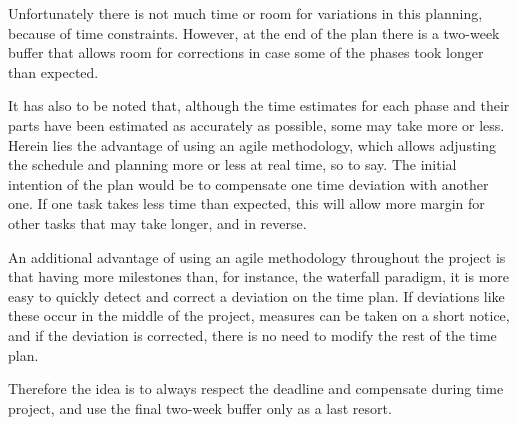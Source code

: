 Unfortunately there is not much time or room for variations in this planning, because of time constraints. However, at the end of the plan there is a two-week buffer that allows room for corrections in case some of the phases took longer than expected.

It has also to be noted that, although the time estimates for each phase and their parts have been estimated as accurately as possible, some may take more or less. Herein lies the advantage of using an agile methodology, which allows adjusting the schedule and planning more or less at real time, so to say. The initial intention of the plan would be to compensate one time deviation with another one. If one task takes less time than expected, this will allow more margin for other tasks that may take longer, and in reverse.

An additional advantage of using an agile methodology throughout the project is that having more milestones than, for instance, the waterfall paradigm, it is more easy to quickly detect and correct a deviation on the time plan. If deviations like these occur in the middle of the project, measures can be taken on a short notice, and if the deviation is corrected, there is no need to modify the rest of the time plan.

Therefore the idea is to always respect the deadline and compensate during time project, and use the final two-week buffer only as a last resort.